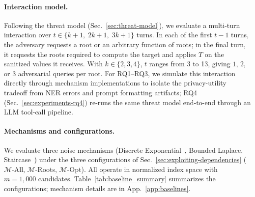\paragraph{Interaction model.} Following the threat model (Sec.~\ref{sec:threat-model}), we evaluate a multi-turn interaction over $t \in \{k{+}1,\; 2k{+}1,\; 3k{+}1\}$ turns. In each of the first $t-1$ turns, the adversary requests a root or an arbitrary function of roots; in the final turn, it requests the roots required to compute the target and applies $T$ on the sanitized values it receives. With $k \in \{2, 3, 4\}$, $t$ ranges from 3 to 13, giving $1$, $2$, or $3$ adversarial queries per root. For RQ1--RQ3, we simulate this interaction directly through mechanism implementations to isolate the privacy-utility tradeoff from NER errors and prompt formatting artifacts; RQ4 (Sec.~\ref{sec:experiments-rq4}) re-runs the same threat model end-to-end through an LLM tool-call pipeline.

\paragraph{Mechanisms and configurations.} We evaluate three noise mechanisms (Discrete Exponential~\cite{mcsherry2007mechanism}, Bounded Laplace, Staircase~\cite{geng2015optimal}) under the three configurations of Sec.~\ref{sec:exploiting-dependencies} ($\mathcal{M}$-All, $\mathcal{M}$-Roots, $\mathcal{M}$-Opt). All operate in normalized index space with $m = 1{,}000$ candidates. Table~\ref{tab:baseline_summary} summarizes the configurations; mechanism details are in App.~\ref{app:baselines}.


